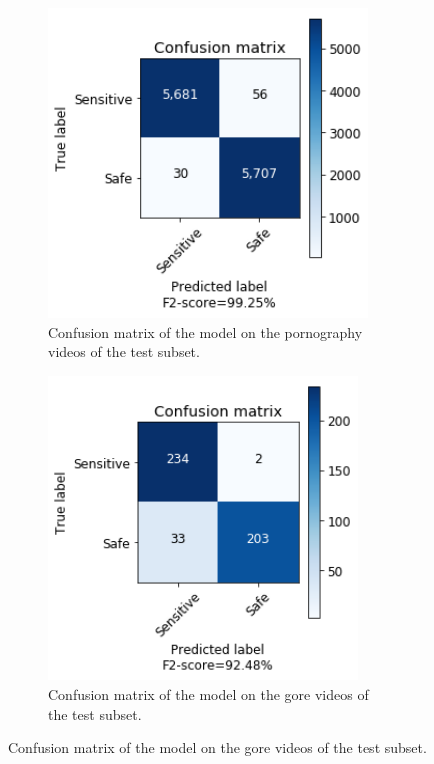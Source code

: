 \begin{figure}[!ht]
    \centering
    \begin{subfigure}[b]{0.49\textwidth}
        \includegraphics[width=0.93\textwidth]{img/results/MLP-TEST-PORN.png}
        \caption{Confusion matrix of the model on the pornography videos of the test subset.}
        \label{fig:cf-test-porn}
    \end{subfigure}
    \begin{subfigure}[b]{0.49\textwidth}
        \includegraphics[width=0.90\textwidth]{img/results/MLP-TEST-GORE.png}
        \caption{Confusion matrix of the model on the gore videos of the test subset.}
        \label{fig:cf-test-gore}
    \end{subfigure}
\end{figure}

